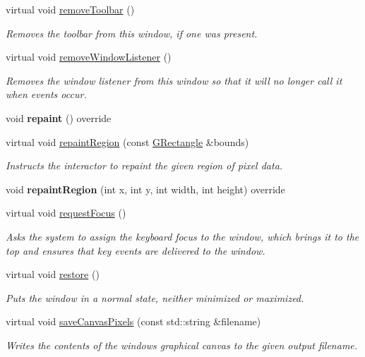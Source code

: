 \begin{DoxyCompactItemize}
virtual void \mbox{\hyperlink{classGWindow_a3d1c6ae17962b89115a4bf1c2f6142eb}{remove\+Toolbar}} ()
\begin{DoxyCompactList}\small\item\em Removes the toolbar from this window, if one was present. \end{DoxyCompactList}\item 
virtual void \mbox{\hyperlink{classGWindow_ab1ea252520cc160b329cfb5b038add83}{remove\+Window\+Listener}} ()
\begin{DoxyCompactList}\small\item\em Removes the window listener from this window so that it will no longer call it when events occur. \end{DoxyCompactList}\item 
void {\bfseries repaint} () override
\item 
virtual void \mbox{\hyperlink{classGDrawingSurface_a769c46fb3e1004aec76e8b0adfa42aa6}{repaint\+Region}} (const \mbox{\hyperlink{structGRectangle}{G\+Rectangle}} \&bounds)
\begin{DoxyCompactList}\small\item\em Instructs the interactor to repaint the given region of pixel data. \end{DoxyCompactList}\item 
void {\bfseries repaint\+Region} (int x, int y, int width, int height) override
\item 
virtual void \mbox{\hyperlink{classGWindow_a519fb2ac767f8b2febbb50b898b8c8cb}{request\+Focus}} ()
\begin{DoxyCompactList}\small\item\em Asks the system to assign the keyboard focus to the window, which brings it to the top and ensures that key events are delivered to the window. \end{DoxyCompactList}\item 
virtual void \mbox{\hyperlink{classGWindow_afd3595051be2709847c2de4352f27cf5}{restore}} ()
\begin{DoxyCompactList}\small\item\em Puts the window in a normal state, neither minimized or maximized. \end{DoxyCompactList}\item 
virtual void \mbox{\hyperlink{classGWindow_aba99f6a53d9bb0493e7fc3ead6a2e4a3}{save\+Canvas\+Pixels}} (const std\+::string \&filename)
\begin{DoxyCompactList}\small\item\em Writes the contents of the window\textquotesingle{}s graphical canvas to the given output filename. \end{DoxyCompactList}\item 

\end{DoxyCompactItemize}
